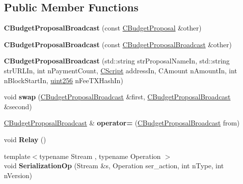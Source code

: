 \subsection*{Public Member Functions}
\begin{DoxyCompactItemize}
\item 
\mbox{\label{class_c_budget_proposal_broadcast_a1990e16be65f91b9fe8ddecbf368f108}} 
{\bfseries C\+Budget\+Proposal\+Broadcast} (const \mbox{\hyperlink{class_c_budget_proposal}{C\+Budget\+Proposal}} \&other)
\item 
\mbox{\label{class_c_budget_proposal_broadcast_abdebe74d19e013273ead62e83a62d962}} 
{\bfseries C\+Budget\+Proposal\+Broadcast} (const \mbox{\hyperlink{class_c_budget_proposal_broadcast}{C\+Budget\+Proposal\+Broadcast}} \&other)
\item 
\mbox{\label{class_c_budget_proposal_broadcast_ab730123d69f4481b88af666914c2da98}} 
{\bfseries C\+Budget\+Proposal\+Broadcast} (std\+::string str\+Proposal\+Name\+In, std\+::string str\+U\+R\+L\+In, int n\+Payment\+Count, \mbox{\hyperlink{class_c_script}{C\+Script}} address\+In, C\+Amount n\+Amount\+In, int n\+Block\+Start\+In, \mbox{\hyperlink{classuint256}{uint256}} n\+Fee\+T\+X\+Hash\+In)
\item 
\mbox{\label{class_c_budget_proposal_broadcast_af4fd5d1ded64319b83b78e6957e8c8f0}} 
void {\bfseries swap} (\mbox{\hyperlink{class_c_budget_proposal_broadcast}{C\+Budget\+Proposal\+Broadcast}} \&first, \mbox{\hyperlink{class_c_budget_proposal_broadcast}{C\+Budget\+Proposal\+Broadcast}} \&second)
\item 
\mbox{\label{class_c_budget_proposal_broadcast_a068fb44d8f0dce19c2fddad8e0b04e01}} 
\mbox{\hyperlink{class_c_budget_proposal_broadcast}{C\+Budget\+Proposal\+Broadcast}} \& {\bfseries operator=} (\mbox{\hyperlink{class_c_budget_proposal_broadcast}{C\+Budget\+Proposal\+Broadcast}} from)
\item 
\mbox{\label{class_c_budget_proposal_broadcast_a7a791236cedfc5beb5fefa438d5626fb}} 
void {\bfseries Relay} ()
\item 
\mbox{\label{class_c_budget_proposal_broadcast_ab0c507f96fb17fd51eb874f7532ae887}} 
{\footnotesize template$<$typename Stream , typename Operation $>$ }\\void {\bfseries Serialization\+Op} (Stream \&s, Operation ser\+\_\+action, int n\+Type, int n\+Version)
\end{DoxyCompactItemize}
